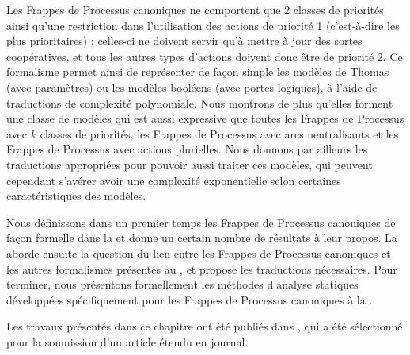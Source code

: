 Les Frappes de Processus canoniques
ne comportent que 2 classes de priorités ainsi qu'une restriction dans
l'utilisation des actions de priorité 1 (c'est-à-dire les plus prioritaires) :
celles-ci ne doivent servir qu'à mettre à jour des sortes coopératives,
et tous les autres types d'actions doivent donc être de priorité 2.
Ce formalisme permet ainsi de représenter de façon simple les modèles de Thomas (avec paramètres)
ou les modèles booléens (avec portes logiques),
à l'aide de traductions de complexité polynomiale.
Nous montrons de plus qu'elles forment une classe de modèles qui est aussi expressive
que toutes les Frappes de Processus avec $k$ classes de priorités,
les Frappes de Processus avec arcs neutralisants
et les Frappes de Processus avec actions plurielles.
Nous donnons par ailleurs les traductions appropriées pour pouvoir aussi traiter ces modèles,
qui peuvent cependant s'avérer avoir une complexité exponentielle
selon certaines caractéristiques des modèles.

\myskip

Nous définissons dans un premier temps les Frappes de Processus canoniques
de façon formelle dans la 
et donne un certain nombre de résultats à leur propos.
La  aborde ensuite
la question du lien entre les Frappes de Processus canoniques
et les autres formalismes présentés au ,
et propose les traductions nécessaires.
Pour terminer, nous présentons formellement
les méthodes d'analyse statiques développées spécifiquement
pour les Frappes de Processus canoniques à la .

Les travaux présentés dans ce chapitre ont été publiés dans
\cite*{FPMR13-CS2Bio},
qui a été sélectionné pour la soumission d'un article étendu en journal.



% 






